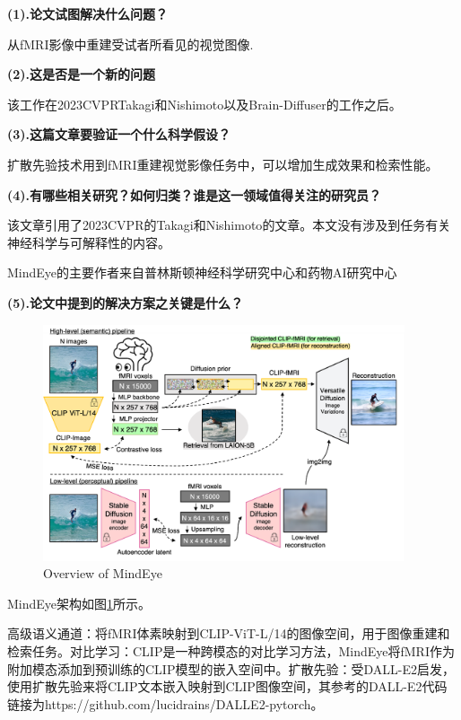 \documentclass[12pt, a4paper, oneside]{ctexart}
\begin{document}
    \noindent\textbf{(1).论文试图解决什么问题？}

    从fMRI影像中重建受试者所看见的视觉图像.

    \noindent\textbf{(2).这是否是一个新的问题}

    该工作在2023CVPRTakagi和Nishimoto\cite{takagi2023high}以及Brain-Diffuser\cite{ozcelik2023natural}的工作之后。

    \noindent\textbf{(3).这篇文章要验证一个什么科学假设？}

    扩散先验技术用到fMRI重建视觉影像任务中，可以增加生成效果和检索性能。

    \noindent\textbf{(4).有哪些相关研究？如何归类？谁是这一领域值得关注的研究员？}

    该文章引用了2023CVPR的Takagi和Nishimoto\cite{takagi2023high}的文章。本文没有涉及到任务有关神经科学与可解释性的内容。

    MindEye的主要作者来自普林斯顿神经科学研究中心和药物AI研究中心

    \noindent\textbf{(5).论文中提到的解决方案之关键是什么？}

     \begin{figure}[ptbp]
        \centering
        \includegraphics[width=0.95\textwidth]{pic/4.3_mindeye overrall.png}
        \caption{Overview of MindEye}
        \label{overview_mindeye}
    \end{figure}

    MindEye架构如图\ref{overview_mindeye}所示。

    高级语义通道：将fMRI体素映射到CLIP-ViT-L/14的图像空间，用于图像重建和检索任务。对比学习：CLIP是一种跨模态的对比学习方法，MindEye将fMRI作为附加模态添加到预训练的CLIP模型的嵌入空间中。扩散先验：受DALL-E2启发，使用扩散先验来将CLIP文本嵌入映射到CLIP图像空间，其参考的DALL-E2代码链接为https://github.com/lucidrains/DALLE2-pytorch。
\end{document}
